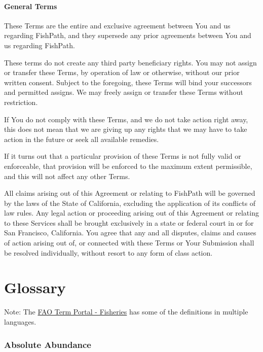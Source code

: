 \documentclass[
  11pt,
]{book}
\begin{document}
\hypertarget{general-terms}{%
\subsubsection*{General Terms}\label{general-terms}}

These Terms are the entire and exclusive agreement between You and us regarding FishPath, and they supersede any prior agreements between You and us regarding FishPath.

These terms do not create any third party beneficiary rights. You may not assign or transfer these Terms, by operation of law or otherwise, without our prior written consent. Subject to the foregoing, these Terms will bind your successors and permitted assigns. We may freely assign or transfer these Terms without restriction.

If You do not comply with these Terms, and we do not take action right away, this does not mean that we are giving up any rights that we may have to take action in the future or seek all available remedies.

If it turns out that a particular provision of these Terms is not fully valid or enforceable, that provision will be enforced to the maximum extent permissible, and this will not affect any other Terms.

All claims arising out of this Agreement or relating to FishPath will be governed by the laws of the State of California, excluding the application of its conflicts of law rules. Any legal action or proceeding arising out of this Agreement or relating to these Services shall be brought exclusively in a state or federal court in or for San Francisco, California. You agree that any and all disputes, claims and causes of action arising out of, or connected with these Terms or Your Submission shall be resolved individually, without resort to any form of class action.

\hypertarget{glossary}{%
\chapter{Glossary}\label{glossary}}





Note: The \href{http://www.fao.org/fishery/glossary/en}{FAO Term Portal - Fisheries} has some of the definitions in multiple languages.

\hypertarget{absolute-abundance}{%
\subsection{Absolute Abundance}\label{absolute-abundance}}
\end{document}
